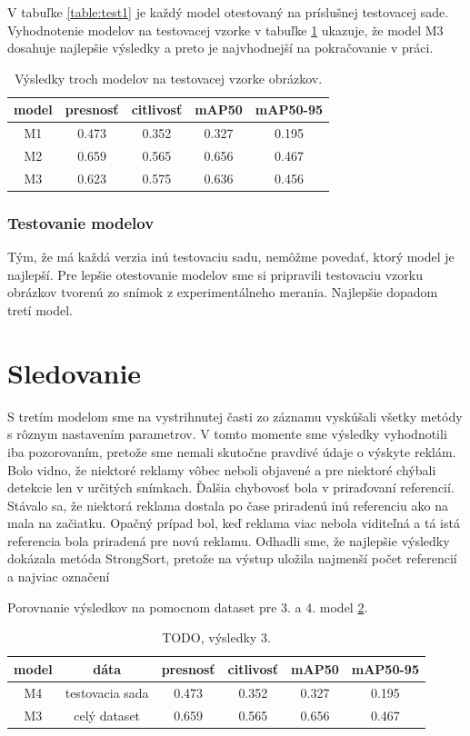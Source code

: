 V tabuľke \ref{table:test1} je každý model otestovaný na príslušnej testovacej sade. Vyhodnotenie modelov na testovacej vzorke v tabuľke \ref{table:test2} ukazuje, že model M3 dosahuje najlepšie výsledky a preto je najvhodnejší na pokračovanie v práci.
\\
\begin{table}[ht]
\centering
\begin{tabular}{ |c c c c c|  }
\hline
model & presnosť & citlivosť & mAP50 & mAP50-95 \\ 
\hline
M1  & 0.473	& 0.352	& 0.327	& 0.195 \\
M2  & 0.659 & 0.565 & 0.656 & 0.467 \\
M3  & 0.623 & 0.575 & 0.636 & 0.456 \\
\hline
\end{tabular}
\caption{Výsledky troch modelov na testovacej vzorke obrázkov.}
\label{table:test2}
\end{table}

\subsubsection{Testovanie modelov}
Tým, že má každá verzia inú testovaciu sadu, nemôžme povedať, ktorý model je najlepší. Pre lepšie otestovanie modelov sme si pripravili testovaciu vzorku obrázkov tvorenú zo snímok z experimentálneho merania. Najlepšie dopadom tretí model.

\section{Sledovanie}

S tretím modelom sme na vystrihnutej časti zo záznamu vyskúšali všetky metódy s rôznym nastavením parametrov. V tomto momente sme výsledky vyhodnotili iba pozorovaním, pretože sme nemali skutočne pravdivé údaje o výskyte reklám. Bolo vidno, že niektoré reklamy vôbec neboli objavené a pre niektoré chýbali detekcie len v určitých snímkach. Ďalšia chybovosť bola v priraďovaní referencií. Stávalo sa, že niektorá reklama dostala po čase priradenú inú referenciu ako na mala na začiatku. Opačný prípad bol, keď reklama viac nebola viditeľná a tá istá referencia bola priradená pre novú reklamu. Odhadli sme, že najlepšie výsledky dokázala metóda StrongSort, pretože na výstup uložila najmenší počet referencií a najviac označení

Porovnanie výsledkov na pomocnom dataset pre 3. a 4. model \ref{table:test3}.
\\
\begin{table}[ht]
\centering
\begin{tabular}{ |c c c c c c| }
\hline
model & dáta & presnosť & citlivosť & mAP50 & mAP50-95 \\ 
\hline
M4 & testovacia sada & 0.473	& 0.352	& 0.327	& 0.195 \\
M3 & celý dataset & 0.659 & 0.565 & 0.656 & 0.467 \\
\hline
\end{tabular}
\caption{TODO, výsledky 3.}
\label{table:test3}
\end{table}

